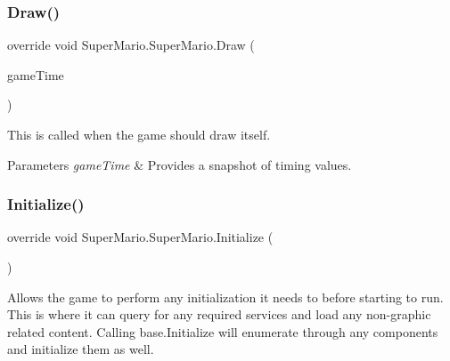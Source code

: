 \subsubsection{\texorpdfstring{Draw()}{Draw()}}
{\footnotesize\ttfamily override void Super\+Mario.\+Super\+Mario.\+Draw (\begin{DoxyParamCaption}\item[{Game\+Time}]{game\+Time }\end{DoxyParamCaption})\hspace{0.3cm}{\ttfamily [protected]}}



This is called when the game should draw itself. 


\begin{DoxyParams}{Parameters}
{\em game\+Time} & Provides a snapshot of timing values.\\
\hline
\end{DoxyParams}
\mbox{\label{class_super_mario_1_1_super_mario_aa2a4ad87d65a4a7a6953eb2dce254734}} 
\subsubsection{\texorpdfstring{Initialize()}{Initialize()}}
{\footnotesize\ttfamily override void Super\+Mario.\+Super\+Mario.\+Initialize (\begin{DoxyParamCaption}{ }\end{DoxyParamCaption})\hspace{0.3cm}{\ttfamily [protected]}}



Allows the game to perform any initialization it needs to before starting to run. This is where it can query for any required services and load any non-\/graphic related content. Calling base.\+Initialize will enumerate through any components and initialize them as well. 

\mbox{\label{class_super_mario_1_1_super_mario_a5253ed5bc61d970892c4b9359de52d1e}} 
